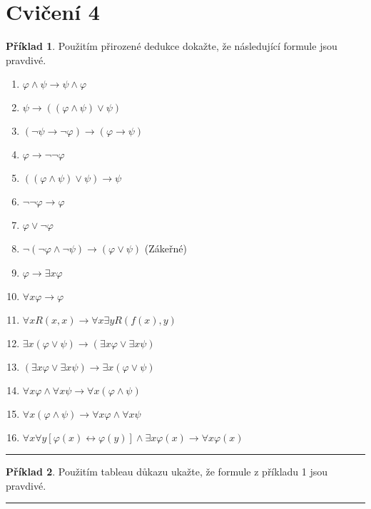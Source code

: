 \documentclass[a4paper]{article}
\theoremstyle{definition}
\newtheorem{priklad}{Příklad}
\begin{document}
\section*{Cvičení 4}
\setcounter{priklad}{0}
\begin{priklad}
    Použitím přirozené dedukce dokažte, že následující formule jsou pravdivé.
    
    \begin{enumerate}
      \item $ \varphi\wedge \psi\rightarrow\psi\wedge\varphi $
      \item $ \psi\rightarrow ((\varphi\wedge\psi)\vee\psi) $
      \item $ (\neg \psi\rightarrow \neg\varphi) \rightarrow (\varphi\rightarrow\psi) $
      \item $ \varphi \rightarrow \neg\neg\varphi $
      \item $ ((\varphi\wedge\psi)\vee\psi) \rightarrow \psi $
      \item $ \neg\neg\varphi \rightarrow \varphi $
      \item $ \varphi\vee \neg\varphi $
      \item $ \neg(\neg\varphi\wedge\neg\psi) \rightarrow (\varphi\vee\psi) $ (Zákeřné)
      \item $ \varphi \rightarrow \exists x\varphi $
      \item $ \forall x\varphi \rightarrow \varphi $
      \item $ \forall xR(x,x) \rightarrow \forall x\exists yR(f(x),y) $
      \item $ \exists x(\varphi\vee\psi) \rightarrow (\exists x\varphi\vee\exists x\psi) $
      \item $ (\exists x\varphi\vee \exists x\psi) \rightarrow \exists x(\varphi\vee\psi) $
      \item $ \forall x\varphi \wedge \forall x\psi \rightarrow \forall x(\varphi\wedge\psi) $
      \item $ \forall x(\varphi\wedge \psi) \rightarrow \forall x\varphi \wedge \forall x\psi $
      \item $ \forall x\forall y[\varphi(x) \leftrightarrow \varphi(y)] \wedge \exists x\varphi(x) \rightarrow \forall x\varphi(x) $
    \end{enumerate}
    
\noindent\rule{\linewidth}{.2pt}    
\end{priklad}

\begin{priklad}
    Použitím tableau důkazu ukažte, že formule z příkladu 1 jsou pravdivé.
    
\noindent\rule{\linewidth}{.2pt}    
\end{priklad}
\end{document}
